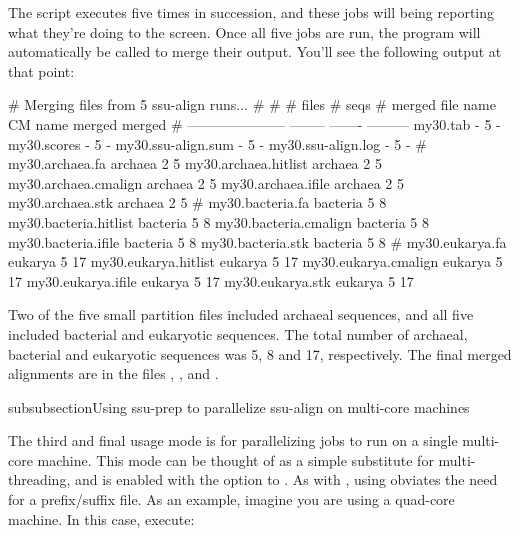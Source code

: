 
The script executes  five times in succession, and
these jobs will being reporting what they're doing to the screen. 
Once all five jobs are run, the  program will
automatically be called to merge their output. You'll see the
following output at that point:

\begin{sreoutput}
# Merging files from 5 ssu-align runs...
#
#                                  # files     # seqs
# merged file name       CM name    merged     merged
# ---------------------  --------  -------  ---------
  my30.tab               -               5          -
  my30.scores            -               5          -
  my30.ssu-align.sum     -               5          -
  my30.ssu-align.log     -               5          -
#
  my30.archaea.fa        archaea         2          5
  my30.archaea.hitlist   archaea         2          5
  my30.archaea.cmalign   archaea         2          5
  my30.archaea.ifile     archaea         2          5
  my30.archaea.stk       archaea         2          5
#
  my30.bacteria.fa       bacteria        5          8
  my30.bacteria.hitlist  bacteria        5          8
  my30.bacteria.cmalign  bacteria        5          8
  my30.bacteria.ifile    bacteria        5          8
  my30.bacteria.stk      bacteria        5          8
#
  my30.eukarya.fa        eukarya         5         17
  my30.eukarya.hitlist   eukarya         5         17
  my30.eukarya.cmalign   eukarya         5         17
  my30.eukarya.ifile     eukarya         5         17
  my30.eukarya.stk       eukarya         5         17
\end{sreoutput}

Two of the five small partition files included archaeal sequences, and
all five included bacterial and eukaryotic  sequences. The total number
of archaeal, bacterial and eukaryotic sequences was 5, 8 and 17,
respectively. The final merged alignments are in the files
, , and
.

subsubsection{Using ssu-prep to parallelize ssu-align
  on multi-core machines}

The third and final  usage mode is for parallelizing
jobs to run on a single multi-core machine. This mode can be thought
of as a simple substitute for multi-threading, and is enabled with the
 option to . As with , using
 obviates the need for a prefix/suffix file. As an example,
imagine you are using a quad-core machine. In this case, execute: 

